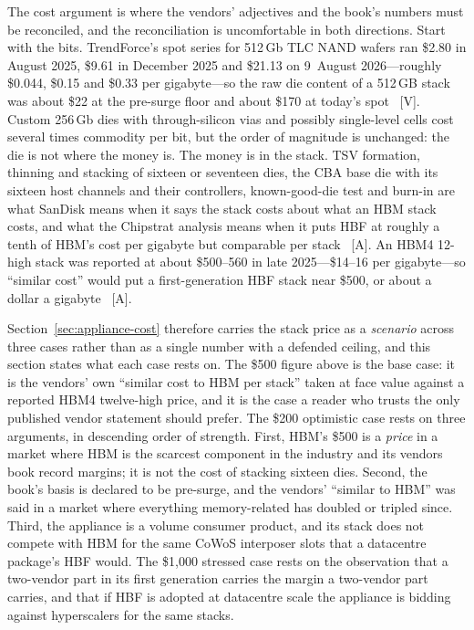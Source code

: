 The cost argument is where the vendors' adjectives and the book's numbers must be reconciled, and the reconciliation is uncomfortable in both directions. Start with the bits. TrendForce's spot series for 512\,Gb TLC NAND wafers ran \$2.80 in August 2025, \$9.61 in December 2025 and \$21.13 on 9~August 2026---roughly \$0.044, \$0.15 and \$0.33 per gigabyte---so the raw die content of a 512\,GB stack was about \$22 at the pre-surge floor and about \$170 at today's spot~\cite{nand-spot} [V]. Custom 256\,Gb dies with through-silicon vias and possibly single-level cells cost several times commodity per bit, but the order of magnitude is unchanged: the die is not where the money is. The money is in the stack. TSV formation, thinning and stacking of sixteen or seventeen dies, the CBA base die with its sixteen host channels and their controllers, known-good-die test and burn-in are what SanDisk means when it says the stack costs about what an HBM stack costs, and what the Chipstrat analysis means when it puts HBF at roughly a tenth of HBM's cost per gigabyte but comparable per stack~\cite{sandisk-hbf-facts,hbf-analysis} [A]. An HBM4 12-high stack was reported at about \$500--560 in late 2025---\$14--16 per gigabyte---so ``similar cost'' would put a first-generation HBF stack near \$500, or about a dollar a gigabyte~\cite{hbf-hbm4-price} [A].

Section~\ref{sec:appliance-cost} therefore carries the stack price as a \emph{scenario} across three cases rather than as a single number with a defended ceiling, and this section states what each case rests on. The \$500 figure above is the base case: it is the vendors' own ``similar cost to HBM per stack'' taken at face value against a reported HBM4 twelve-high price, and it is the case a reader who trusts the only published vendor statement should prefer. The \$200 optimistic case rests on three arguments, in descending order of strength. First, HBM's \$500 is a \emph{price} in a market where HBM is the scarcest component in the industry and its vendors book record margins; it is not the cost of stacking sixteen dies. Second, the book's basis is declared to be pre-surge, and the vendors' ``similar to HBM'' was said in a market where everything memory-related has doubled or tripled since. Third, the appliance is a volume consumer product, and its stack does not compete with HBM for the same CoWoS interposer slots that a datacentre package's HBF would. The \$1,000 stressed case rests on the observation that a two-vendor part in its first generation carries the margin a two-vendor part carries, and that if HBF is adopted at datacentre scale the appliance is bidding against hyperscalers for the same stacks.

